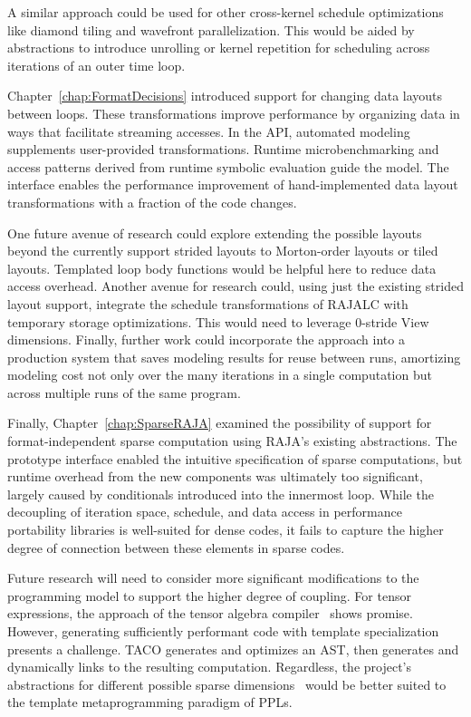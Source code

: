 A similar approach could be used for other cross-kernel schedule optimizations like diamond tiling and wavefront parallelization. 
This would be aided by abstractions to introduce unrolling or kernel repetition for scheduling across iterations of an outer time loop.

Chapter~\ref{chap:FormatDecisions} introduced support for changing data layouts between loops.
These transformations improve performance by organizing data in ways that facilitate streaming accesses.
In the \FormatDecisions{} API, automated modeling supplements user-provided transformations.
Runtime microbenchmarking and access patterns derived from runtime symbolic evaluation guide the model.
The interface enables the performance improvement of hand-implemented data layout transformations with a fraction of the code changes.

One future avenue of research could explore extending the possible layouts beyond the currently support strided layouts to Morton-order layouts or tiled layouts.
Templated loop body functions would be helpful here to reduce data access overhead.
Another avenue for research could, using just the existing strided layout support, integrate the schedule transformations of RAJALC with temporary storage optimizations.
This would need to leverage 0-stride View dimensions.
Finally, further work could incorporate the approach into a production system that saves modeling results for reuse between runs, amortizing modeling cost not only over the many iterations in a single computation but across multiple runs of the same program.

Finally, Chapter~\ref{chap:SparseRAJA} examined the possibility of support for format-independent sparse computation using RAJA's existing abstractions.
The prototype interface enabled the intuitive specification of sparse computations, but runtime overhead from the new components was ultimately too significant, largely caused by conditionals introduced into the innermost loop.
While the decoupling of iteration space, schedule, and data access in performance portability libraries is well-suited for dense codes, it fails to capture the higher degree of connection between these elements in sparse codes.

Future research will need to consider more significant modifications to the programming model to support the higher degree of coupling.
For tensor expressions, the approach of the tensor algebra compiler~\cite{kjolstad2017tensor} shows promise.
However, generating sufficiently performant code with template specialization presents a challenge.
TACO generates and optimizes an AST, then generates and dynamically links to the resulting computation.
Regardless, the project's abstractions for different possible sparse dimensions~\cite{chou2018format} would be better suited to the template metaprogramming paradigm of PPLs.


